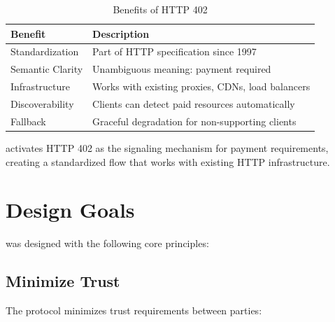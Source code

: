 \begin{table}[htbp]
\centering
\caption{Benefits of HTTP 402}
\label{tab:http402-benefits}
\begin{tabular}{l p{7cm}}
\toprule
\textbf{Benefit} & \textbf{Description} \\
\midrule
Standardization & Part of HTTP specification since 1997 \\
Semantic Clarity & Unambiguous meaning: payment required \\
Infrastructure & Works with existing proxies, CDNs, load balancers \\
Discoverability & Clients can detect paid resources automatically \\
Fallback & Graceful degradation for non-supporting clients \\
\bottomrule
\end{tabular}
\end{table}

\tprotocol{} activates HTTP 402 as the signaling mechanism for payment requirements, creating a standardized flow that works with existing HTTP infrastructure.

\section{Design Goals}
\label{sec:design-goals}

\tprotocol{} was designed with the following core principles:

\subsection{Minimize Trust}

The protocol minimizes trust requirements between parties:

